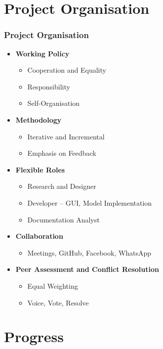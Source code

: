 \documentclass{beamer}
\begin{document}
\section{Project Organisation}

\begin{frame}
\frametitle{Project Organisation}

\begin{itemize}
\item \textbf{Working Policy}
	\begin{itemize}
		\item Cooperation and Equality
		\item Responsibility
		\item Self-Organisation
	\end{itemize}
\item \textbf{Methodology}
	\begin{itemize}
		\item Iterative and Incremental
		\item Emphasis on Feedback
	\end{itemize}
\item \textbf{Flexible Roles}
	\begin{itemize}
		\item Research and Designer
		\item Developer – GUI, Model Implementation
		\item Documentation Analyst
	\end{itemize}
\item \textbf{Collaboration}
	\begin{itemize}
		\item Meetings, GitHub, Facebook, WhatsApp
	\end{itemize}	
\item \textbf{Peer Assessment and Conflict Resolution}
	\begin{itemize}
		\item Equal Weighting
		\item Voice, Vote, Resolve
	\end{itemize}	
\end{itemize}

\end{frame}

\section{Progress}
\end{document}

